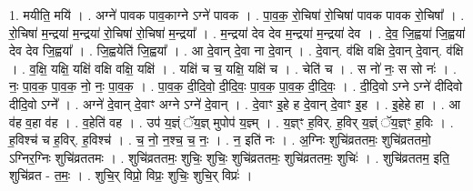 \documentclass[17pt]{extarticle}
\begin{document}
1. मयीति॒ मयि॑ । . अग्ने॑ पावक पाव॒काग्ने ऽग्ने॑ पावक । . पा॒व॒क॒ रो॒चिषा॑ रो॒चिषा॑ पावक पावक रो॒चिषा᳚ । . रो॒चिषा॑ म॒न्द्रया॑ म॒न्द्रया॑ रो॒चिषा॑ रो॒चिषा॑ म॒न्द्रया᳚ । . म॒न्द्रया॑ देव देव म॒न्द्रया॑ म॒न्द्रया॑ देव । . दे॒व॒ जि॒ह्वया॑ जि॒ह्वया॑ देव देव जि॒ह्वया᳚ । . जि॒ह्वयेति॑ जि॒ह्वया᳚ । . आ दे॒वान् दे॒वा ना दे॒वान् । . दे॒वान्. व॑क्षि वक्षि दे॒वान् दे॒वान्. व॑क्षि । . व॒क्षि॒ यक्षि॒ यक्षि॑ वक्षि वक्षि॒ यक्षि॑ । . यक्षि॑ च च॒ यक्षि॒ यक्षि॑ च । . चेति॑ च । . स नो॑ नः॒ स सो नः॑ । . नः॒ पा॒व॒क॒ पा॒व॒क॒ नो॒ नः॒ पा॒व॒क॒ । . पा॒व॒क॒ दी॒दि॒वो॒ दी॒दि॒वः॒ पा॒व॒क॒ पा॒व॒क॒ दी॒दि॒वः॒ । . दी॒दि॒वो ऽग्ने ऽग्ने॑ दीदिवो दीदि॒वो ऽग्ने᳚ । . अग्ने॑ दे॒वान् दे॒वाꣳ अग्ने ऽग्ने॑ दे॒वान् । . दे॒वाꣳ इ॒हे ह दे॒वान् दे॒वाꣳ इ॒ह । . इ॒हेहे हा । . आ व॑ह व॒हा व॑ह । . व॒हेति॑ वह । . उप॑ य॒ज्ञ्ं ॅय॒ज्ञ् मुपोप॑ य॒ज्ञ्म् । . य॒ज्ञ्ꣳ ह॒विर्. ह॒विर् य॒ज्ञ्ं ॅय॒ज्ञ्ꣳ ह॒विः । . ह॒विश्च॑ च ह॒विर्. ह॒विश्च॑ । . च॒ नो॒ न॒श्च॒ च॒ नः॒ । . न॒ इति॑ नः । . अ॒ग्निः शुचि॑व्रततमः॒ शुचि॑व्रततमो॒ ऽग्निर॒ग्निः शुचि॑व्रततमः । . शुचि॑व्रततमः॒ शुचिः॒ शुचिः॒ शुचि॑व्रततमः॒ शुचि॑व्रततमः॒ शुचिः॑ । . शुचि॑व्रततम॒ इति॒ शुचि॑व्रत - त॒मः॒ । . शुचि॒र् विप्रो॒ विप्रः॒ शुचिः॒ शुचि॒र् विप्रः॑ । \newline
\end{document}
